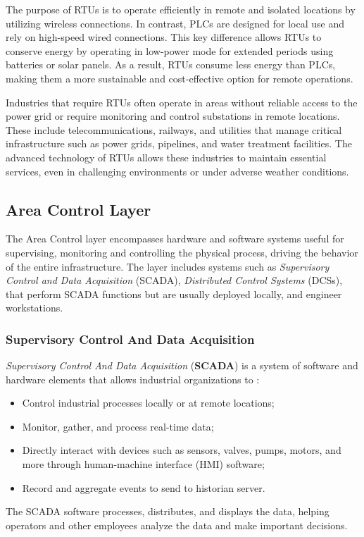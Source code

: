 \bigskip
The purpose of RTUs is to operate efficiently in remote and isolated locations by utilizing wireless connections. In contrast, PLCs are designed for local use and rely on high-speed wired connections. This key difference allows RTUs to conserve energy by operating in low-power mode for extended periods using batteries or solar panels. As a result, RTUs consume less energy than PLCs, making them a more sustainable and cost-effective option for remote operations.

\bigskip
Industries that require RTUs often operate in areas without reliable access to the power grid or require monitoring and control substations in remote locations. These include telecommunications, railways, and utilities that manage critical infrastructure such as power grids, pipelines, and water treatment facilities. The advanced technology of RTUs allows these industries to maintain essential services, even in challenging environments or under adverse weather conditions.

\subsection{Area Control Layer}
\label{subsec:2_ot_control_system}
The Area Control layer encompasses hardware and software systems useful for supervising, monitoring and controlling the physical process, driving the behavior of the entire infrastructure. The layer includes systems such as \textit{Supervisory Control and Data Acquisition} (SCADA), \textit{Distributed Control Systems} (DCSs), that perform SCADA functions but are usually deployed locally, and engineer workstations.

\subsubsection{Supervisory Control And Data Acquisition}
\label{subsubsec:2_scada}

\textit{Supervisory Control And Data Acquisition} (\textbf{SCADA}) is a system of software and hardware elements that allows industrial organizations to \cite{scada_definition}:

\begin{itemize}
	\item Control industrial processes locally or at remote locations;
	
	\item Monitor, gather, and process real-time data;

	\item Directly interact with devices such as sensors, valves, pumps, motors, and more through human-machine interface (HMI) software;

	\item Record and aggregate events to send to historian server.
\end{itemize}
The SCADA software processes, distributes, and displays the data, helping operators and other employees analyze the data and make important decisions.


